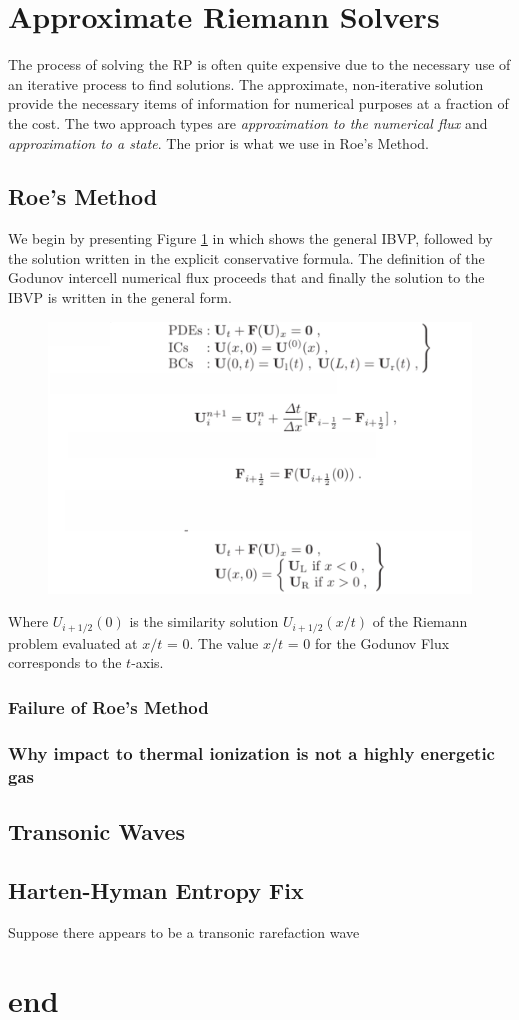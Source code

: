 \documentclass[]{article}
\begin{document}
\section{Approximate Riemann Solvers}
	The process of solving the RP is often quite expensive due to the necessary use of an iterative process to find solutions. The approximate, non-iterative solution provide the necessary items of information for numerical purposes at a fraction of the cost. The two approach types are \textit{approximation to the numerical flux} and \textit{approximation to a state}. The prior is what we use in Roe's Method.
		
	\subsection{Roe's Method}
	
		We begin by presenting Figure \ref{ARP IBVP} in which shows the general IBVP, followed by the solution written in the explicit conservative formula. The definition of the Godunov intercell numerical flux proceeds that and finally the solution to the IBVP is written in the general form.
		\begin{figure}[h] 	
			\centering
			\includegraphics[scale=.50]{Approx_RP_GodFlux_IBVP}
			\caption{}
			\label{ARP IBVP}
		\end{figure}
		Where $ U_{i+1/2}(0) $ is the similarity solution $ U_{i+1/2}(x/t) $ of the Riemann problem evaluated at $ x/t $ = 0. The value $ x/t $ = 0 for the Godunov Flux corresponds to the $ t $-axis.
			
		\subsubsection{Failure of Roe's Method}		
		\subsubsection{Why impact to thermal ionization is not a highly energetic gas}
	\subsection{Transonic Waves}
	\subsection{Harten-Hyman Entropy Fix}
		Suppose there appears to be a transonic rarefaction wave
		
\section{end}


\end{document}
